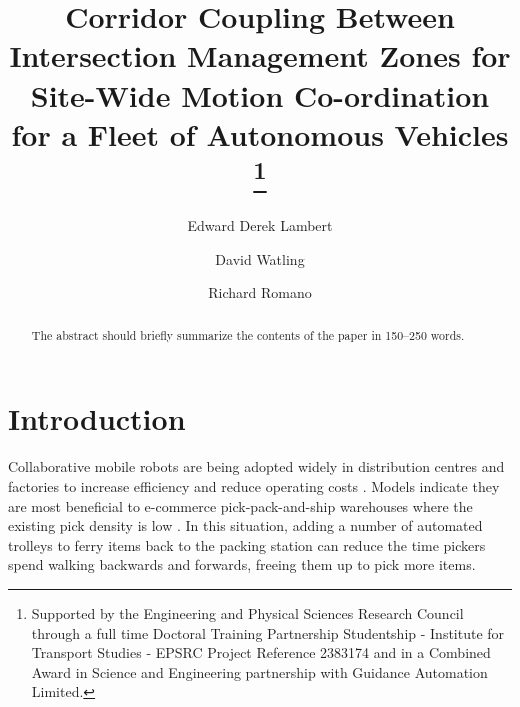 \documentclass[runningheads]{llncs}
\begin{document}
%
\title{Corridor Coupling Between Intersection Management Zones for Site-Wide Motion Co-ordination for a Fleet of Autonomous Vehicles  
\thanks{Supported by the Engineering and Physical Sciences Research Council through a full time Doctoral Training Partnership Studentship - Institute for Transport Studies - EPSRC Project Reference 2383174 and in a Combined Award in Science and Engineering partnership with Guidance Automation Limited. 
 }}
%
%
\author{Edward Derek Lambert \and
David Watling   \and
Richard Romano}
%
%
%
\maketitle              %
%
\begin{abstract}
The abstract should briefly summarize the contents of the paper in
150--250 words.

\end{abstract}
%
%
%
%
%
\section{Introduction}

Collaborative mobile robots are being adopted widely in distribution centres and factories to increase efficiency and reduce operating costs \cite{Azadeh2019}. Models indicate they are most beneficial to e-commerce pick-pack-and-ship warehouses where the existing pick density is low \cite{Meller2018}. In this situation, adding a number of automated trolleys to ferry items back to the packing station can reduce the time pickers spend walking backwards and forwards, freeing them up to pick more items.
\end{document}
